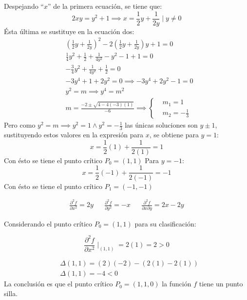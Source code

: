 Despejando ``$x$'' de la primera ecuación, se tiene que:
\begin{equation*}
	2xy=y^2+1\implies x=\frac{1}{2}y+\frac{1}{2y}\mid y\neq 0
\end{equation*}
Ésta última se sustituye en la ecuación dos:
\begin{align*}
	 & \left(\frac{1}{2}y+\frac{1}{2y}\right)^2-2\left(\frac{1}{2}y+\frac{1}{2y}\right)y+1=0 \\
	 & \frac{1}{4}y^2+\frac{1}{2}+\frac{1}{4y^2}-y^2-1+1=0                                   \\
	 & -\frac{3}{4}y^2+\frac{1}{4y^2}+\frac{1}{2}=0                                          \\
	 & -3y^4+1+2y^2=0\implies -3y^4+2y^2-1=0                                                 \\
	 & y^2=m\implies y^4=m^2                                                                 \\
	 & m=\frac{-2\pm\sqrt{4-4(-3)(1)}}{-6}\implies \begin{cases}
		                                                & m_1=1 \\&m_2=-\frac{1}{3}
	                                               \end{cases}
\end{align*}
Pero como $y^2=m\implies y^2=1\land y^2=-\frac{1}{3}$
las únicas soluciones son $y\pm 1$, sustituyendo estos valores en la expresión para $x$, se obtiene para $y=1$:
\begin{equation*}
	x=\frac{1}{2}(1)+\frac{1}{2(1)}=1
\end{equation*}
Con ésto se tiene el punto crítico $P_0=(1,1)$
Para $y=-1$:
\begin{equation*}
	x=\frac{1}{2}(-1)+\frac{1}{2(-1)}=-1
\end{equation*}
Con ésto se tiene el punto crítico $P_1=(-1,-1)$

\begin{align*}
	\frac{\partial^2 f}{\partial x^2}=2y &  & \frac{\partial^2 f}{\partial y^2}=-x &  & \frac{\partial^2 f}{\partial x\partial y}=2x-2y
\end{align*}

Considerando el punto crítico $P_0=\left(1,1\right)$ para su clasificación:

\begin{equation*}
	\frac{\partial^2 f}{\partial x^2}\mid_{(1,1)}=2(1)=2>0
\end{equation*}

\begin{align*}
	 & \Delta(1,1)=(2)(-2)-\left(2(1)-2(1)\right) \\
	 & \Delta(1,1)=-4<0
\end{align*}
La conclusión es que el punto crítico $P_0=(1,1,0)$ la función $f$
tiene un punto silla.

